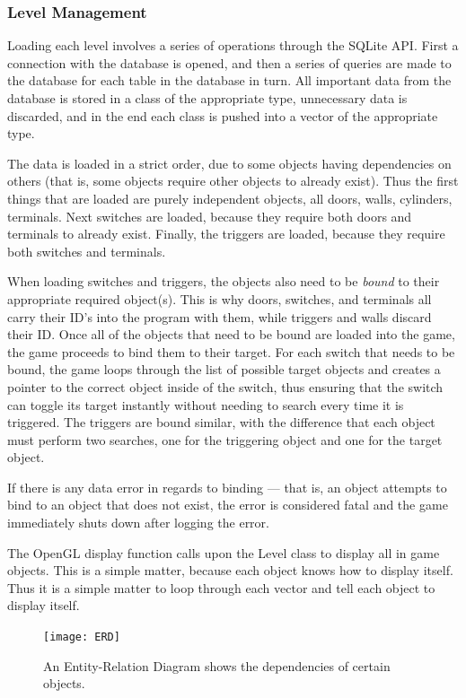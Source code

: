 \documentclass{article}
\begin{document}
\subsubsection{Level Management} \label{subsubsec:load}

Loading each level involves a series of operations through the SQLite API. First a connection with the database is opened, and then a series of queries are made to the database for each table in the database in turn. All important data from the database is stored in a class of the appropriate type, unnecessary data is discarded, and in the end each class is pushed into a vector of the appropriate type. 

The data is loaded in a strict order, due to some objects having dependencies on others (that is, some objects require other objects to already exist). Thus the first things that are loaded are purely independent objects, all doors, walls, cylinders, terminals. Next switches are loaded, because they require both doors and terminals to already exist. Finally, the triggers are loaded, because they require both switches and terminals.

When loading switches and triggers, the objects also need to be \emph{bound} to their appropriate required object(s). This is why doors, switches, and terminals all carry their ID's into the program with them, while triggers and walls discard their ID. Once all of the objects that need to be bound are loaded into the game, the game proceeds to bind them to their target. For each switch that needs to be bound, the game loops through the list of possible target objects and creates a pointer to the correct object inside of the switch, thus ensuring that the switch can toggle its target instantly without needing to search every time it is triggered. The triggers are bound similar, with the difference that each object must perform two searches, one for the triggering object and one for the target object.

If there is any data error in regards to binding --- that is, an object attempts to bind to an object that does not exist, the error is considered fatal and the game immediately shuts down after logging the error.

The OpenGL display function calls upon the Level class to display all in game objects. This is a simple matter, because each object knows how to display itself. Thus it is a simple matter to loop through each vector and tell each object to display itself.

\begin{figure}[H]
	\centering
	\texttt{[image: ERD]}
	\caption{An Entity-Relation Diagram shows the dependencies of certain objects.}
	\label{fig:erd}
\end{figure}
\end{document}
